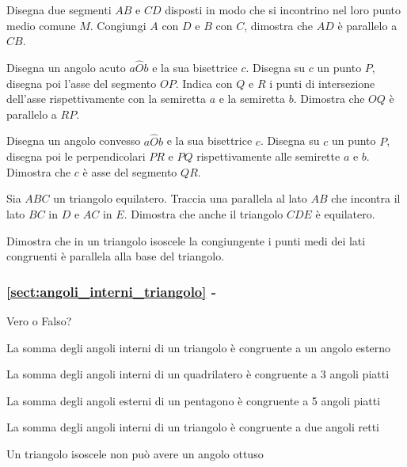 \begin{multicols}{2}
\begin{esercizio}
\label{ese:3.42}
Disegna due segmenti $AB$ e $CD$ disposti in modo che si incontrino 
nel loro punto medio comune $M$. Congiungi $A$ con $D$ e $B$ con $C$, 
dimostra che $AD$ è parallelo a $CB$.
\end{esercizio}

\begin{esercizio}
\label{ese:3.43}
Disegna un angolo acuto $a\widehat{O}b$ e la sua bisettrice $c$. 
Disegna su $c$ un punto $P$, disegna poi l'asse del segmento $OP$. 
Indica con $Q$ e $R$ i punti di intersezione dell'asse 
rispettivamente con la semiretta $a$ e la semiretta $b$. Dimostra che 
$OQ$ è parallelo a $RP$.
\end{esercizio}

\begin{esercizio}
\label{ese:3.44}
Disegna un angolo convesso $a\widehat{O}b$ e la sua bisettrice $c$. 
Disegna su $c$ un punto $P$, disegna poi le perpendicolari $PR$ e 
$PQ$ rispettivamente alle semirette $a$ e $b$. Dimostra che $c$ è asse 
del segmento $QR$.
\end{esercizio}

\begin{esercizio}
\label{ese:3.45}
Sia $ABC$ un triangolo equilatero. Traccia una parallela al lato $AB$ 
che incontra il lato $BC$ in $D$ e $AC$ in $E$. Dimostra che anche il 
triangolo $CDE$ è equilatero.
\end{esercizio}

\begin{esercizio}
	\label{ese:3.66}
	Dimostra che in un triangolo isoscele la congiungente i punti medi 
	dei lati congruenti è parallela alla base del triangolo.
\end{esercizio}

\begingroup
\hypersetup{linkcolor=black}
\subsubsection*{\ref{sect:angoli_interni_triangolo} - 
}
\endgroup

\begin{esercizio}
\label{ese:3.47}
Vero o Falso?
\begin{enumeratea}
\item La somma degli angoli interni di un triangolo è congruente a un 
angolo esterno\tab\tab\hfill\boxV\quad\boxF
\item La somma degli angoli interni di un quadrilatero è congruente a 
3 angoli piatti\tab\tab\hfill\boxV\quad\boxF
\item La somma degli angoli esterni di un pentagono è congruente a 5 
angoli piatti\hfill\boxV\quad\boxF
\item La somma degli angoli interni di un triangolo è congruente a 
due angoli retti\hfill\boxV\quad\boxF
\item Un triangolo isoscele non può avere un angolo 
ottuso\hfill\boxV\quad\boxF
\end{enumeratea}
\end{esercizio}


\end{multicols}
